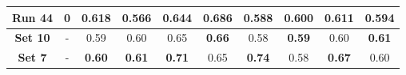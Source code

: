\begin{table}[!ht]
\begin{tabular}{|c|c|cc|cc|cc|cc|}
			\textbf{Run 44} & 0 & 0.618 & 0.566 & 0.644 & \textbf{0.686} & 0.588 & 0.600 & 0.611 & 0.594 \\
			
			\hline
			
			\textbf{Set 10} & - & 0.59 & 0.60 & 0.65 & \textbf{0.66} & 0.58 & \textbf{0.59} & 0.60 & \textbf{0.61} \\
			
			\hline
			\hline
			
			\textbf{Set 7} & - & \textbf{0.60} & \textbf{0.61} & \textbf{0.71} & 0.65 & \textbf{0.74} & 0.58 & \textbf{0.67} & 0.60 \\
			
			\hline
			
	\end{tabular}
	\label{tab:Experiment2IRF}
\end{table}

